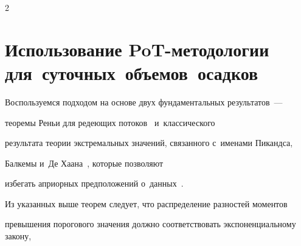 \begin{multicols}{2}
\begin{figure}[b]
\vspace*{-6pt}


\label{FigPotsdamPOT}


\end{figure}





\vspace*{-18pt}





\section{Использование PoT-методологии для~суточных~объемов~осадков}


\label{DailyData}





\vspace*{-1pt}





Воспользуемся подходом на основе двух фундаментальных результатов~--- 


тео\-ре\-мы Реньи для редеющих потоков~\cite{Gnedenko1996} и~классического 


результата тео\-рии экстремальных значений, связанного с~именами Пикандса, 


Балкемы и~Де Хаана~\cite{Balkema1974,Pickands1975}, которые позволяют 


избегать априорных предположений о~данных~\cite{Gorshenin2017a}. 


Из указанных выше тео\-рем следует, что распределение разностей моментов 


превышения порогового значения должно соответствовать экспоненциальному закону, 



\end{multicols}
